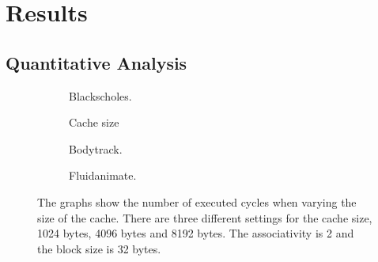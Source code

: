 \section{Results}

\subsection{Quantitative Analysis}




\begin{figure}[ht]
    \centering
    \begin{subfigure}[b]{0.33\textwidth}
        \centering
        \caption{Blackscholes.}
        \label{fig:cache_size_blackscholes}
    \end{subfigure}%
    \hfill
    \begin{subfigure}[b]{0.33\textwidth}
        \centering
        Cache size\par\medskip
        \caption{Bodytrack.}
        \label{fig:cache_size_bodytrack}
    \end{subfigure}%
    \hfill
    \begin{subfigure}[b]{0.33\textwidth}
        \centering
        \caption{Fluidanimate.}
        \label{fig:cache_size_fluidanimate}
    \end{subfigure}
    \hfill
    \caption{The graphs show the number of executed cycles when varying the size of the cache. There are three different settings for the cache size, 1024 bytes, 4096 bytes and 8192 bytes. The associativity is 2 and the block size is 32 bytes.}
    \label{fig:cache_size}
\end{figure}


